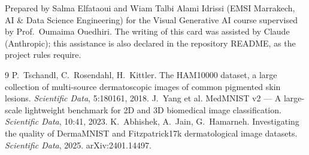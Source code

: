 \documentclass[11pt,a4paper]{article}
\begin{document}
Prepared by Salma Elfataoui and Wiam Talbi Alami Idrissi (EMSI Marrakech, AI \& Data Science
Engineering) for the Visual Generative AI course supervised by Prof.~Oumaima Ouedhiri. The writing
of this card was assisted by Claude (Anthropic); this assistance is also declared in the
repository README, as the project rules require.

\begin{thebibliography}{9}\small
{} P.~Tschandl, C.~Rosendahl, H.~Kittler. The HAM10000 dataset, a large
collection of multi-source dermatoscopic images of common pigmented skin lesions.
\emph{Scientific Data}, 5:180161, 2018.
 J.~Yang et al. MedMNIST v2 --- A large-scale lightweight benchmark for 2D and
3D biomedical image classification. \emph{Scientific Data}, 10:41, 2023.
 K.~Abhishek, A.~Jain, G.~Hamarneh. Investigating the quality of
DermaMNIST and Fitzpatrick17k dermatological image datasets. \emph{Scientific Data}, 2025.
arXiv:2401.14497.
\end{thebibliography}
\end{document}
